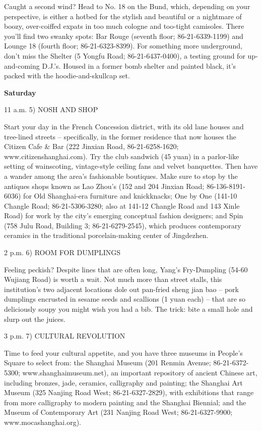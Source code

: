 \documentclass[12pt,a4paper,onecolumn]{article}
\begin{document}
\begin{CJK*}{GBK}{song}
\begin{description}
Caught a second wind? Head to No. 18 on the Bund, which, depending on your perspective, is either a
hotbed for the stylish and beautiful or a nightmare of boozy, over-coiffed expats in too much
cologne and too-tight camisoles. There you'll find two swanky spots: Bar Rouge (seventh floor;
86-21-6339-1199) and Lounge 18 (fourth floor; 86-21-6323-8399). For something more underground,
don't miss the Shelter (5 Yongfu Road; 86-21-6437-0400), a testing ground for up-and-coming D.J.'s.
Housed in a former bomb shelter and painted black, it's packed with the hoodie-and-skullcap set.

\textbf{Saturday}

11 a.m. 5) NOSH AND SHOP

Start your day in the French Concession district, with its old lane houses and tree-lined streets --
specifically, in the former residence that now houses the Citizen Cafe \& Bar (222 Jinxian Road,
86-21-6258-1620; www.citizenshanghai.com). Try the club sandwich (45 yuan) in a parlor-like setting
of wainscoting, vintage-style ceiling fans and velvet banquettes. Then have a wander among the
area's fashionable boutiques. Make sure to stop by the antiques shops known as Lao Zhou's (152 and
204 Jinxian Road; 86-136-8191-6036) for Old Shanghai-era furniture and knickknacks; One by One
(141-10 Changle Road; 86-21-5306-3280; also at 141-12 Changle Road and 143 Xinle Road) for work by
the city's emerging conceptual fashion designers; and Spin (758 Julu Road, Building 3;
86-21-6279-2545), which produces contemporary ceramics in the traditional porcelain-making center of
Jingdezhen.

\item{2 p.m.} 6) ROOM FOR DUMPLINGS

Feeling peckish? Despite lines that are often long, Yang's Fry-Dumpling (54-60 Wujiang Road) is
worth a wait. Not much more than street stalls, this institution's two adjacent locations dole out
pan-fried sheng jian bao -- pork dumplings encrusted in sesame seeds and scallions (1 yuan each) --
that are so deliciously soupy you might wish you had a bib. The trick: bite a small hole and slurp
out the juices.

\item{3 p.m.} 7) CULTURAL REVOLUTION

Time to feed your cultural appetite, and you have three museums in People's Square to select from:
the Shanghai Museum (201 Renmin Avenue; 86-21-6372-5300; www.shanghaimuseum.net), an important
repository of ancient Chinese art, including bronzes, jade, ceramics, calligraphy and painting; the
Shanghai Art Museum (325 Nanjing Road West; 86-21-6327-2829), with exhibitions that range from more
calligraphy to modern painting and the Shanghai Biennial; and the Museum of Contemporary Art (231
Nanjing Road West; 86-21-6327-9900; www.mocashanghai.org).


\end{description}
\end{CJK*}
\end{document}
